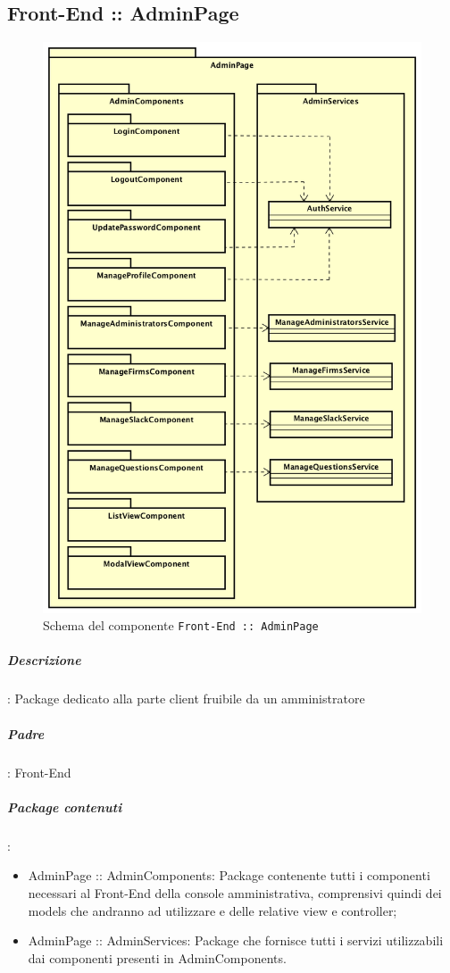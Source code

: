 \documentclass[../ManualeSviluppatore_v2.0.0.tex]{subfiles}
\begin{document}
	\newpage
	\subsection{Front-End :: AdminPage}
	\begin{figure}[!h]
		\centering
		\includegraphics[scale=0.3]{Architettura/Front-End/AdminPage/AdminPage.png}
		\caption{Schema del componente \texttt{Front-End :: AdminPage}}
	\end{figure}
			\subparagraph{Descrizione}: Package dedicato alla parte client fruibile da un amministratore
			\subparagraph{Padre}: Front-End
			\subparagraph{Package contenuti}:
			\begin{itemize}
				\item AdminPage :: AdminComponents: Package contenente tutti i componenti necessari al Front-End della console amministrativa, comprensivi quindi dei models che andranno ad utilizzare e delle relative view e controller;
				\item AdminPage :: AdminServices: Package che fornisce tutti i servizi utilizzabili dai componenti presenti in AdminComponents.
			\end{itemize}
\end{document}
